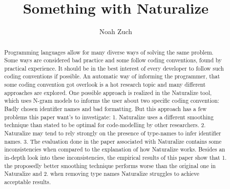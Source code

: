 \documentclass[sigconf]{acmart}
\begin{document}
\title{Something with Naturalize}

\author{Noah Zuch}


\renewcommand{\shortauthors}{Zuch}

\begin{abstract}
  Programming languages allow for many diverse ways of solving the same problem. Some ways are considered bad practice and some follow coding conventions, found by practical experience. It should be in the best interest of every developer to follow such coding conventions if possible.
  An automatic way of informing the programmer, that some coding convention got overlook is a hot research topic and many different approaches are explored. One possible approach is realized in the Naturalize tool, which uses N-gram models to informs the user about two specific coding convention: Badly chosen identifier names and bad formatting. But this approach has a few problems this paper want's to investigate: 1. Naturalize uses a different smoothing technique than stated to be optimal for code-modelling by other researchers. 2. Naturalize may tend to rely strongly on the presence of type-names to infer identifier names. 3. The evaluation done in the paper associated with Naturalize contains some inconsistencies when compared to the explanation of how Naturalize works. Besides an in-depth look into these inconsistencies, the empirical results of this paper show that 1. the proposedly better smoothing technique performs worse than the original one in Naturalize and 2. when removing type names Naturalize struggles to achieve acceptable results.
\end{abstract}
\end{document}
